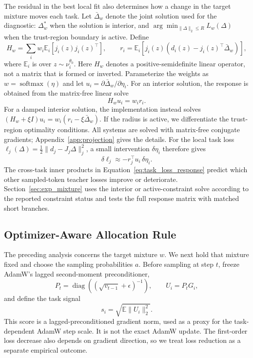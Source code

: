The residual in the best local fit also determines how a change in the target
mixture moves each task. Let $\bar\Delta_w$ denote the joint solution used for
the diagnostic: $\Delta_w^*$ when the solution is interior, and
$\arg\min_{\|\Delta\|_2\le R}L_w(\Delta)$ when the trust-region boundary is
active. Define
\begin{equation}
    H_w=\sum_i w_i
        \mathbb E_i[j_i(z)j_i(z)^\top],
    \qquad
    r_i=\mathbb E_i
        [j_i(z)(d_i(z)-j_i(z)^\top\bar\Delta_w)],
    \label{eq:local_curvature_simple}
\end{equation}
where $\mathbb E_i$ is over $z\sim\nu_i^{\theta_0}$. Here $H_w$ denotes a
positive-semidefinite linear operator, not a matrix that is formed or
inverted. Parameterize the weights as $w=\operatorname{softmax}(\eta)$ and let
$u_i=\partial\bar\Delta_w/\partial\eta_i$. For an interior solution, the
response is obtained from the matrix-free linear solve
\begin{equation}
    H_wu_i=w_i r_i.
    \label{eq:weight_sensitivity}
\end{equation}
For a damped interior solution, the implementation instead solves
$(H_w+\xi I)u_i=w_i(r_i-\xi\bar\Delta_w)$. If the radius is active, we
differentiate the trust-region optimality conditions. All systems are solved
with matrix-free conjugate gradients; Appendix~\ref{app:projection} gives the
details.
For the local task loss
$\ell_j(\Delta)=\tfrac12\|d_j-J_j\Delta\|_j^2$, a small intervention
$\delta\eta_i$ therefore gives
\begin{equation}
    \delta \ell_j
    \approx
    -r_j^\top u_i\,\delta\eta_i.
    \label{eq:task_loss_response}
\end{equation}
The cross-task inner products in Equation~\ref{eq:task_loss_response} predict
which other sampled-token teacher losses improve or deteriorate.
Section~\ref{sec:exp_mixture} uses the interior or active-constraint solve
according to the reported constraint status and tests the full response
matrix with matched short branches.


\subsection{Optimizer-Aware Allocation Rule}
\label{sec:gpas}

The preceding analysis concerns the target mixture $w$. We next hold that
mixture fixed and choose the sampling probabilities $a$. Before sampling at
step $t$, freeze AdamW's lagged second-moment preconditioner,
\begin{equation}
    P_t=\operatorname{diag}
    \left((\sqrt{v_{t-1}}+\epsilon)^{-1}\right),
    \qquad
    U_i=P_tG_i,
    \label{eq:optimizer_update}
\end{equation}
and define the task signal
\begin{equation}
    s_i=\sqrt{\mathbb E\|U_i\|_2^2}.
    \label{eq:optimizer_scale}
\end{equation}
This score is a lagged-preconditioned gradient norm, used as a proxy for the
task-dependent AdamW step scale. It is not the exact AdamW update. The
first-order loss decrease also depends on gradient direction, so we treat loss
reduction as a separate empirical outcome.

